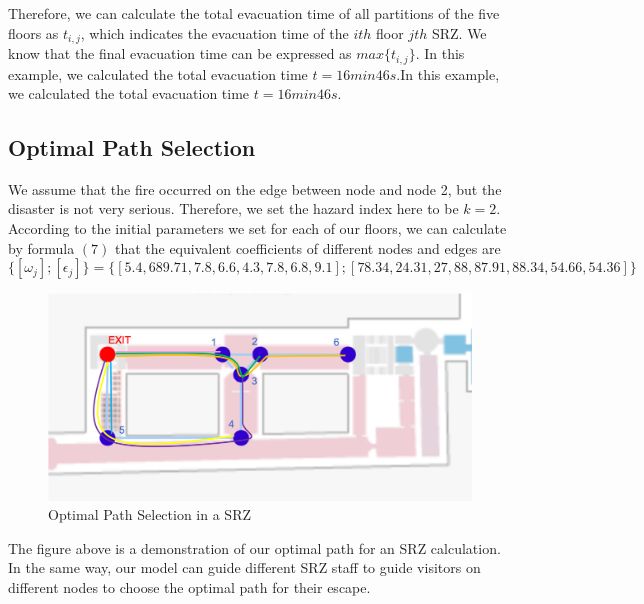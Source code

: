 Therefore, we can calculate the total evacuation time of all partitions of the five floors as ${t_{i,j}}$, which indicates the evacuation time of the $ith$ floor $jth$ SRZ. We know that the final evacuation time can be expressed as $max\{t_{i,j}\}$. In this example, we calculated the total evacuation time $t=16min46s$.In this example, we calculated the total evacuation time $t=16min46s$.

\subsection{Optimal Path Selection}

We assume that the fire occurred on the edge between node and node 2, but the disaster is not very serious. Therefore, we set the hazard index here to be $k=2$. According to the initial parameters we set for each of our floors, we can calculate by formula $(7)$ that the equivalent coefficients of different nodes and edges are
\[
\{[\omega_j];[\epsilon_j]\}=\{[5.4,689.71,7.8,6.6,4.3,7.8,6.8,9.1];[78.34,
24.31,27,88,87.91,88.34,54.66,54.36]\}
\]

\begin{figure}[ht]
    \centering
    \includegraphics[scale=0.4]{han9.png}
    \caption{Optimal Path Selection in a SRZ}
    \label{1}
\end{figure}

The figure above is a demonstration of our optimal path for an SRZ calculation. In the same way, our model can guide different SRZ staff to guide visitors on different nodes to choose the optimal path for their escape.






